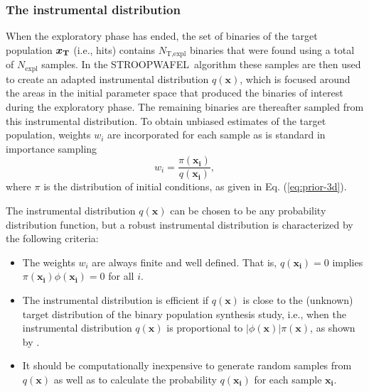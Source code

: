 \documentclass[a4paper,fleqn,usenatbib,useAMS,usedcolumn]{mnras}
\newcommand{\AISs}{\textsc{STROOPWAFEL}}
\newcommand{\NEhits}{$N_{\text{T,expl}}$ }
\newcommand{\NE}{$N_{\text{expl}}$ }
\begin{document}
\subsubsection{The instrumental distribution}
\label{subsec:instrumental-distribution}
When the exploratory phase has ended, the set of binaries of the target population $\boldsymbol{x_{\rm{T}}}$  (i.e., hits) contains \NEhits  binaries that were found using a total of \NE samples. In the \AISs \ algorithm these samples are then used to create an adapted instrumental distribution $q(\boldsymbol{x})$, which is focused around the areas in the initial parameter space that produced the binaries of interest during the exploratory phase.  The remaining binaries are thereafter sampled from this instrumental distribution.  To obtain unbiased estimates of the target population, weights ${w_i}$ are incorporated for each sample as is standard in importance sampling
%
\begin{equation}
	{w_i} = \frac{\pi(\boldsymbol{x_i})}{q(\boldsymbol{x_i})},
	\label{eq:weights}
\end{equation} 
%
where $\pi$ is the distribution of initial conditions, as given in Eq. (\ref{eq:prior-3d}). 

The instrumental distribution $q(\boldsymbol{x})$ can be chosen to be any probability distribution function, but a robust instrumental distribution is characterized by the following criteria:
%
\begin{itemize}
	\item The weights $w_i$ are always finite and well defined. That is, $q(\boldsymbol{x_i}) = 0$ implies  $ \pi(\boldsymbol{x_i})\phi(\boldsymbol{x_i})  =0$ for all $i$.
	\item The instrumental distribution is efficient if  $q(\boldsymbol{x})$ is close to the (unknown) target distribution of the binary population synthesis study, i.e., when the instrumental distribution $q(\boldsymbol{x}) $ is proportional to $ | \phi(\boldsymbol{x}) | \pi(\boldsymbol{x}) $, as shown by \citet{10.2307/166789}. 
	\item It should be computationally inexpensive to generate random samples from $q(\boldsymbol{x})$ as well as to calculate the probability $q(\boldsymbol{x_i})$ for each sample $\boldsymbol{x_i}$. 
\end{itemize}
%
\end{document}
